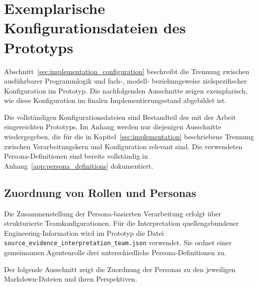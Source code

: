 \section{Exemplarische Konfigurationsdateien des Prototyps}
\label{app:configuration_examples}

Abschnitt~\ref{sec:implementation_configuration} beschreibt die Trennung
zwischen ausführbarer Programmlogik und fach-, modell- beziehungsweise
zielspezifischer Konfiguration im Prototyp. Die nachfolgenden Ausschnitte
zeigen exemplarisch, wie diese Konfiguration im finalen Implementierungsstand
abgebildet ist.

Die vollständigen Konfigurationsdateien sind Bestandteil des mit der Arbeit
eingereichten Prototyps. Im Anhang werden nur diejenigen Ausschnitte
wiedergegeben, die für die in Kapitel~\ref{sec:implementation} beschriebene
Trennung zwischen Verarbeitungskern und Konfiguration relevant sind.
Die verwendeten Persona-Definitionen sind bereits vollständig in
Anhang~\ref{app:persona_definitions} dokumentiert.


\subsection{Zuordnung von Rollen und Personas}
\label{app:configuration_team}

Die Zusammenstellung der Persona-basierten Verarbeitung erfolgt über
strukturierte Teamkonfigurationen. Für die Interpretation quellengebundener
Engineering-Information wird im Prototyp die Datei
\texttt{source\_evidence\_interpretation\_team.json} verwendet.
Sie ordnet einer gemeinsamen Agentenrolle drei unterschiedliche
Persona-Definitionen zu.

Der folgende Ausschnitt zeigt die Zuordnung der Personas zu den jeweiligen
Markdown-Dateien und ihren Perspektiven.

